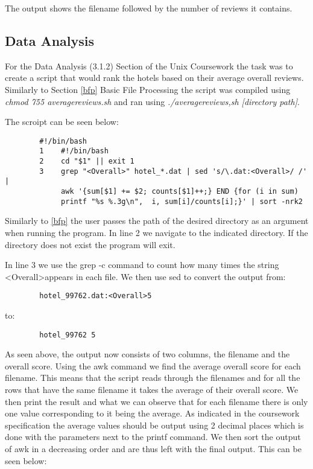 \documentclass[titlepage]{article}
\begin{document}
            The output shows the filename followed by the number of reviews it contains.
        
        \subsection{Data Analysis\label{da}}
        
        For the Data Analysis (3.1.2) Section of the Unix Coursework the task was to create a script that would rank the hotels based on their average overall reviews. Similarly to Section \ref{bfp} Basic File Processing the script was compiled using \textit{chmod 755 averagereviews.sh} and ran using \textit{./averagereviews,sh [directory path]}.
        
        The scroipt can be seen below:
   		\begin{lstlisting}
        #!/bin/bash
        1    #!/bin/bash
        2    cd "$1" || exit 1
        3    grep "<Overall>" hotel_*.dat | sed 's/\.dat:<Overall>/ /' | 
             awk '{sum[$1] += $2; counts[$1]++;} END {for (i in sum) 
             printf "%s %.3g\n",  i, sum[i]/counts[i];}' | sort -nrk2
        \end{lstlisting}
        
        Similarly to \ref{bfp} the user passes the path of the desired directory as an argument when running the program. In line 2 we navigate to the indicated directory. If the directory does not exist the program will exit.
        
        In line 3 we use the grep -c command to count how many times the string \textless Overall\textgreater appears in each file. We then use sed to convert the output from:
        \begin{lstlisting}
        hotel_99762.dat:<Overall>5
        \end{lstlisting}
        to:
        \begin{lstlisting}
        hotel_99762 5
        \end{lstlisting}
        
        As seen above, the output now consists of two columns, the filename and the overall score. Using the awk command we find the average overall score for each filename. This means that the script reads through the filenames and for all the rows that have the same filename it takes the average of their overall score. We then print the result and what we can observe that for each filename there is only one value corresponding to it being the average. As indicated in the coursework specification the average values should be output using 2 decimal places which is done with the parameters next to the printf command. We then sort the output of awk in a decreasing order and are thus left with the final output. This can be seen below:
        
\end{document}
